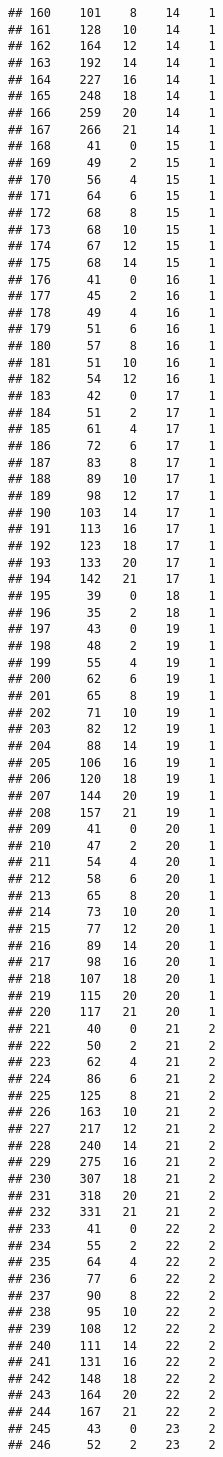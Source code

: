 \documentclass[
]{article}
\begin{document}
\begin{verbatim}
## 160    101    8    14    1
## 161    128   10    14    1
## 162    164   12    14    1
## 163    192   14    14    1
## 164    227   16    14    1
## 165    248   18    14    1
## 166    259   20    14    1
## 167    266   21    14    1
## 168     41    0    15    1
## 169     49    2    15    1
## 170     56    4    15    1
## 171     64    6    15    1
## 172     68    8    15    1
## 173     68   10    15    1
## 174     67   12    15    1
## 175     68   14    15    1
## 176     41    0    16    1
## 177     45    2    16    1
## 178     49    4    16    1
## 179     51    6    16    1
## 180     57    8    16    1
## 181     51   10    16    1
## 182     54   12    16    1
## 183     42    0    17    1
## 184     51    2    17    1
## 185     61    4    17    1
## 186     72    6    17    1
## 187     83    8    17    1
## 188     89   10    17    1
## 189     98   12    17    1
## 190    103   14    17    1
## 191    113   16    17    1
## 192    123   18    17    1
## 193    133   20    17    1
## 194    142   21    17    1
## 195     39    0    18    1
## 196     35    2    18    1
## 197     43    0    19    1
## 198     48    2    19    1
## 199     55    4    19    1
## 200     62    6    19    1
## 201     65    8    19    1
## 202     71   10    19    1
## 203     82   12    19    1
## 204     88   14    19    1
## 205    106   16    19    1
## 206    120   18    19    1
## 207    144   20    19    1
## 208    157   21    19    1
## 209     41    0    20    1
## 210     47    2    20    1
## 211     54    4    20    1
## 212     58    6    20    1
## 213     65    8    20    1
## 214     73   10    20    1
## 215     77   12    20    1
## 216     89   14    20    1
## 217     98   16    20    1
## 218    107   18    20    1
## 219    115   20    20    1
## 220    117   21    20    1
## 221     40    0    21    2
## 222     50    2    21    2
## 223     62    4    21    2
## 224     86    6    21    2
## 225    125    8    21    2
## 226    163   10    21    2
## 227    217   12    21    2
## 228    240   14    21    2
## 229    275   16    21    2
## 230    307   18    21    2
## 231    318   20    21    2
## 232    331   21    21    2
## 233     41    0    22    2
## 234     55    2    22    2
## 235     64    4    22    2
## 236     77    6    22    2
## 237     90    8    22    2
## 238     95   10    22    2
## 239    108   12    22    2
## 240    111   14    22    2
## 241    131   16    22    2
## 242    148   18    22    2
## 243    164   20    22    2
## 244    167   21    22    2
## 245     43    0    23    2
## 246     52    2    23    2

\end{verbatim}
\end{document}
